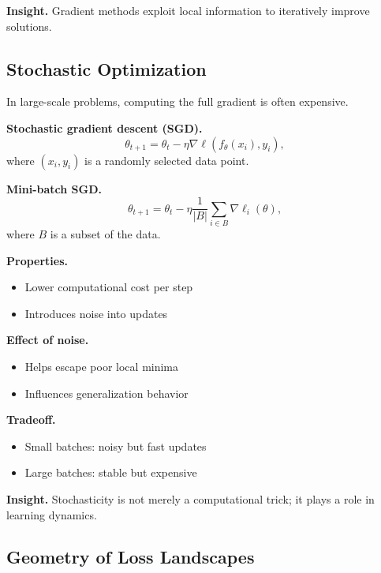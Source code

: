 \medskip

\noindent
\textbf{Insight.}  
Gradient methods exploit local information to iteratively improve solutions.

\subsection{Stochastic Optimization}

In large-scale problems, computing the full gradient is often expensive.

\medskip

\noindent
\textbf{Stochastic gradient descent (SGD).}
\[
\theta_{t+1} = \theta_t - \eta \nabla \ell(f_\theta(x_i), y_i),
\]
where $(x_i, y_i)$ is a randomly selected data point.

\medskip

\noindent
\textbf{Mini-batch SGD.}
\[
\theta_{t+1} = \theta_t - \eta \frac{1}{|B|} \sum_{i \in B} \nabla \ell_i(\theta),
\]
where $B$ is a subset of the data.

\medskip

\noindent
\textbf{Properties.}
\begin{itemize}
    \item Lower computational cost per step
    \item Introduces noise into updates
\end{itemize}

\medskip

\noindent
\textbf{Effect of noise.}
\begin{itemize}
    \item Helps escape poor local minima
    \item Influences generalization behavior
\end{itemize}

\medskip

\noindent
\textbf{Tradeoff.}
\begin{itemize}
    \item Small batches: noisy but fast updates
    \item Large batches: stable but expensive
\end{itemize}

\medskip

\noindent
\textbf{Insight.}  
Stochasticity is not merely a computational trick; it plays a role in learning dynamics.

\subsection{Geometry of Loss Landscapes}

